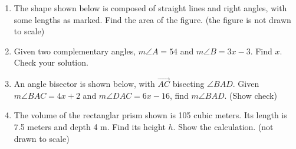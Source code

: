 \documentclass[12pt, twoside]{article}
\begin{document}
\begin{enumerate}
  \item The shape shown below is composed of straight lines and right angles, with some lengths as marked. Find the area of the figure. (the figure is not drawn to scale)
  \begin{flushleft}
  \end{flushleft} \vspace{2cm}

  \item Given two complementary angles, $m\angle A = 54$ and $m\angle B = 3x-3$. Find $x$. Check your solution. \vspace{3.5cm} 
 
\newpage

  \item An angle bisector is shown below, with $\overrightarrow{AC}$ bisecting $\angle BAD$. Given $m\angle BAC = 4x+2$ and $m\angle DAC = 6x-16$, find $m\angle BAD$. (Show check)
  \begin{flushright}
  \end{flushright} \vspace{2cm}

\item The volume of the rectanglar prism shown is 105 cubic meters. Its length is 7.5 meters and depth 4 m. Find its height $h$. Show the calculation. (not drawn to scale)
\begin{flushright}
  \end{flushright} \vspace{1cm} 


\end{enumerate}
\end{document}
